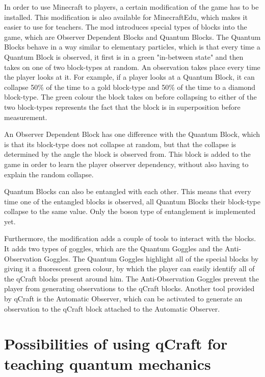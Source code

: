 \documentclass[11pt,twoside]{report} %
\begin{document}
In order to use Minecraft to players, a certain modification of the game has to be installed. This modification is also available for MinecraftEdu, which makes it easier to use for teachers. The mod introduces special types of blocks into the game, which are Observer Dependent Blocks and Quantum Blocks. The Quantum Blocks behave in a way similar to elementary particles, which is that every time a Quantum Block is observed, it first is in a green "in-between state" and then takes on one of two block-types at random. An observation takes place every time the player looks at it. For example, if a player looks at a Quantum Block, it can collapse 50\% of the time to a gold block-type and 50\% of the time to a diamond block-type. The green colour the block takes on before collapsing to either of the two block-types represents the fact that the block is in superposition before measurement.

An Observer Dependent Block has one difference with the Quantum Block, which is that its block-type does not collapse at random, but that the collapse is determined by the angle the block is observed from. This block is added to the game in order to learn the player observer dependency, without also having to explain the random collapse. 

Quantum Blocks can also be entangled with each other. This means that every time one of the entangled blocks is observed, all Quantum Blocks their block-type collapse to the same value. Only the boson type of entanglement is implemented yet.

Furthermore, the modification adds a couple of tools to interact with the blocks. It adds two types of goggles, which are the Quantum Goggles and the Anti-Observation Goggles. The Quantum Goggles highlight all of the special blocks by giving it a fluorescent green colour, by which the player can easily identify all of the qCraft blocks present around him. The Anti-Observation Goggles prevent the player from generating observations to the qCraft blocks. Another tool provided by qCraft is the Automatic Observer, which can be activated to generate an observation to the qCraft block attached to the Automatic Observer.

\section{Possibilities of using qCraft for teaching quantum mechanics}
\end{document}
